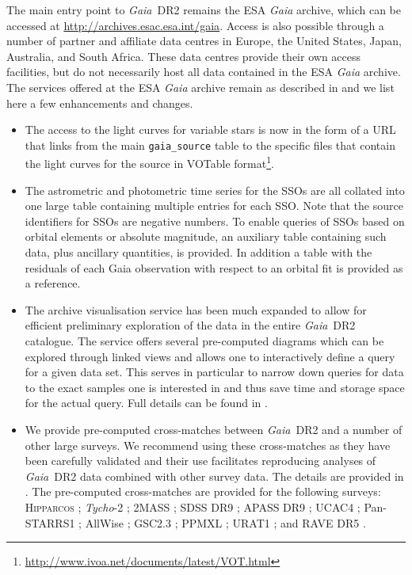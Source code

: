 \documentclass[longauth]{aa_gaia} %
\newcommand\gaia{\textit{Gaia}}
\newcommand\gdr[1]{\gaia~DR#1}
\newcommand\hip{\textsc{Hipparcos}}
\newcommand\tyc{\textit{Tycho}}
\begin{document}
The main entry point to \gdr{2} remains the ESA {\gaia} archive, which can be accessed at
\url{http://archives.esac.esa.int/gaia}. Access is also possible through a number of partner and
affiliate data centres in Europe, the United States, Japan, Australia, and South Africa. These data
centres provide their own access facilities, but do not necessarily host all data contained in the
ESA {\gaia} archive. The services offered at the ESA {\gaia} archive remain as described in
\cite{2016A&A...595A...2G} and we list here a few enhancements and changes.
\begin{itemize}
  \item The access to the light curves for variable stars is now in the form of a URL that links
    from the main \texttt{gaia\_source} table to the specific files that contain the light curves
    for the source in VOTable format\footnote{\url{http://www.ivoa.net/documents/latest/VOT.html}}.
  \item The astrometric and photometric time series for the SSOs are all collated into one large
    table containing multiple entries for each SSO. Note that the source identifiers for SSOs are
    negative numbers. To enable queries of SSOs based on orbital elements or absolute magnitude, an
    auxiliary table containing such data, plus ancillary quantities, is provided. In addition a
    table with the residuals of each Gaia observation with respect to an orbital fit is provided
    as a reference.
  \item The archive visualisation service \citep{2017A&A...605A..52M} has been much expanded to
    allow for efficient preliminary exploration of the data in the entire \gdr{2} catalogue. The
    service offers several pre-computed diagrams which can be explored through linked views and
    allows one to interactively define a query for a given data set. This serves in particular to
    narrow down queries for data to the exact samples one is interested in and thus save time and
    storage space for the actual query. Full details can be found in \cite{DR2-DPACP-42}.
  \item We provide pre-computed cross-matches between \gdr{2} and a number of other large surveys.
    We recommend using these cross-matches as they have been carefully validated and their use
    facilitates reproducing analyses of \gdr{2} data combined with other survey data. The details
    are provided in \cite{DR2-DPACP-41}. The pre-computed cross-matches are provided for the
    following surveys: {\hip} \citep[new reduction,][]{book:newhip}; {\tyc}-2
    \citep{2000A&A...355L..27H}; 2MASS \citep{2006AJ....131.1163S}; SDSS DR9
    \citep{2012ApJS..203...21A}; APASS DR9 \citep{apass9, 2015AAS...22533616H}; UCAC4
    \citep{2013AJ....145...44Z}; Pan-STARRS1 \citep{2016arXiv161205560C}; AllWise
    \citep{2010AJ....140.1868W}; GSC2.3 \citep{2008AJ....136..735L}; PPMXL
    \citep{2010AJ....139.2440R}; URAT1 \citep{2015AJ....150..101Z}; and RAVE DR5
    \citep{2017AJ....153...75K}.
\end{itemize}
\end{document}
